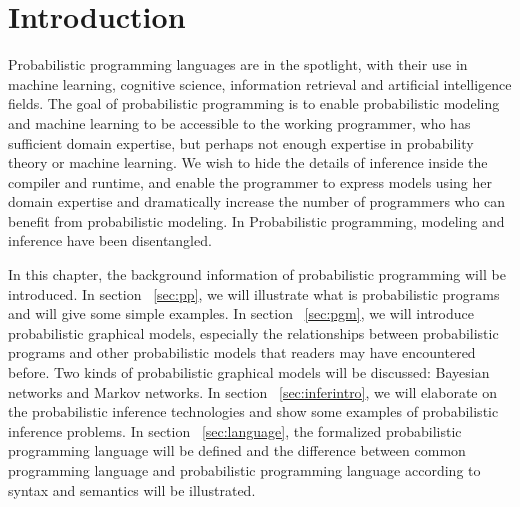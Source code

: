 \chapter{Introduction}
\label{chap:intro}
Probabilistic programming languages are in the spotlight, with their use in machine learning, cognitive science, information retrieval and artificial intelligence fields. The goal of probabilistic programming is to enable probabilistic modeling and machine learning to be accessible to the working programmer, who has sufficient domain expertise, but perhaps not enough expertise in probability theory or machine learning. We wish to hide the details of inference inside the compiler and runtime, and enable the programmer to express models using her domain expertise and dramatically increase the number of programmers who can benefit from probabilistic modeling. In Probabilistic programming, modeling and inference have been disentangled.

In this chapter, the background information of probabilistic programming will be introduced. In section ~\ref{sec:pp}, we will illustrate what is probabilistic programs and will give some simple examples. In section ~\ref{sec:pgm}, we will introduce probabilistic graphical models, especially the relationships between probabilistic programs and other probabilistic models that readers may have encountered before. Two kinds of probabilistic graphical models will be discussed: Bayesian networks and Markov networks. In section ~\ref{sec:inferintro}, we will elaborate on the probabilistic inference technologies and show some examples of probabilistic inference problems. In section ~\ref{sec:language}, the formalized probabilistic programming language will be defined and the difference between common programming language and probabilistic programming language according to syntax and semantics will be illustrated. 

